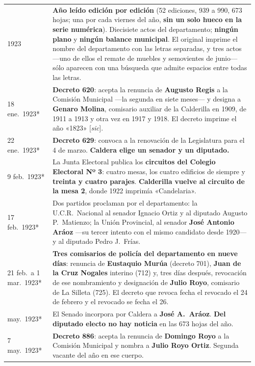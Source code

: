 \begin{longtable}{@{}p{2.7cm}p{10.3cm}@{}}
1923 & \textbf{Año leído edición por edición} (52 ediciones, 939 a 990, 673 hojas; una por cada viernes del año, \textbf{sin un solo hueco en la serie numérica}). Diecisiete actos del departamento; \textbf{ningún plano} y \textbf{ningún balance municipal}. El original imprime el nombre del departamento con las letras separadas, y tres actos ---uno de ellos el remate de muebles y semovientes de junio--- sólo aparecen con una búsqueda que admite espacios entre todas las letras. \\
18 ene.\ 1923* & \textbf{Decreto 620}: acepta la renuncia de \textbf{Augusto Regis}\index{Regis, Augusto} a la Comisión Municipal ---la segunda en siete meses--- y designa a \textbf{Genaro Molina}, comisario auxiliar de la Calderilla en 1909, de 1911 a 1913 y otra vez en 1917 y 1918. El decreto imprime el año «1823» [\textit{sic}]. \\
22 ene.\ 1923* & \textbf{Decreto 629}: convoca a la renovación de la Legislatura para el 4 de marzo. \textbf{Caldera elige un senador y un diputado.} \\
9 feb.\ 1923* & La Junta Electoral publica los \textbf{circuitos del Colegio Electoral Nº 3}: cuatro mesas, los cuatro edificios de siempre y \textbf{treinta y cuatro parajes}. \textbf{Calderilla vuelve al circuito de la mesa 2}, donde 1922 imprimía «Candelaria». \\
17 feb.\ 1923* & Dos partidos proclaman por el departamento: la U.C.R.\ Nacional al senador Ignacio Ortiz y al diputado Augusto P.\ Matienzo; la Unión Provincial, al senador \textbf{José Antonio Aráoz} ---su tercer intento con el mismo candidato desde 1920--- y al diputado Pedro J.\ Frías. \\
21 feb.\ a 1 mar.\ 1923* & \textbf{Tres comisarios de policía del departamento en nueve días}: renuncia de \textbf{Eustaquio Murúa}\index{Murúa, Eustaquio} (decreto 701), \textbf{Juan de la Cruz Nogales} interino (712) y, tres días después, revocación de ese nombramiento y designación de \textbf{Julio Royo}, comisario de La Silleta (725). El decreto que revoca fecha el revocado el 24 de febrero y el revocado se fecha el 26. \\
may.\ 1923* & El Senado incorpora por Caldera a \textbf{José A.\ Aráoz}. \textbf{Del diputado electo no hay noticia} en las 673 hojas del año. \\
7 may.\ 1923* & \textbf{Decreto 886}: acepta la renuncia de \textbf{Domingo Royo} a la Comisión Municipal y nombra a \textbf{Julio Royo Ortiz}. Segunda vacante del año en ese cuerpo. \\

\end{longtable}
